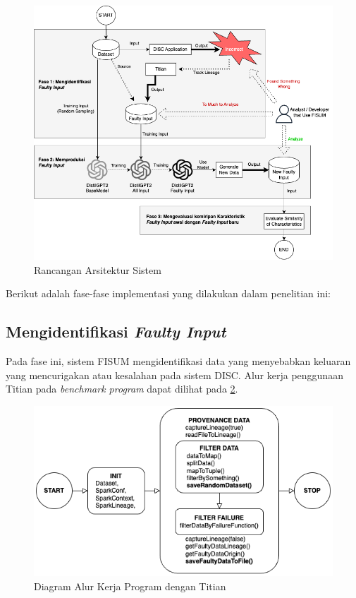 \begin{figure}[H]
  \centering
  \includegraphics[scale=0.5]{gambar/ArsitekturFISUM.png}

  \caption{Rancangan Arsitektur Sistem}
  \label{fig:arsitektur2}
\end{figure}

Berikut adalah fase-fase implementasi yang dilakukan dalam
penelitian ini:

\subsection{Mengidentifikasi \emph{Faulty Input}}
\label{sec:mengidentifikasifaultyinput}

Pada fase ini, sistem FISUM mengidentifikasi data 
yang menyebabkan keluaran yang mencurigakan atau 
kesalahan pada sistem DISC. Alur kerja penggunaan Titian pada \emph{benchmark program}
dapat dilihat pada \ref{fig:diagramofprogramwithtitian}.

\begin{figure}[H]
  \centering
  \includegraphics[scale=0.5]{gambar/DiagramOfProgramWithTitian.png}

  \caption{Diagram Alur Kerja Program dengan Titian}
  \label{fig:diagramofprogramwithtitian}
\end{figure}

